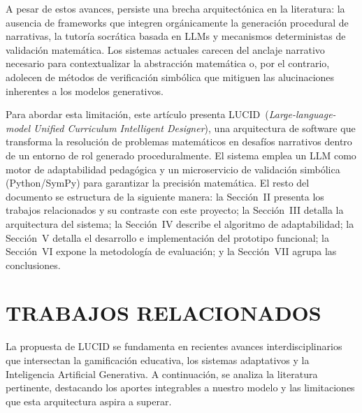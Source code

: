 \documentclass{ieeetj}
\begin{document}
A pesar de estos avances, persiste una brecha arquitect\'onica en la literatura: la ausencia
de frameworks que integren org\'anicamente la generaci\'on procedural de narrativas, la
tutor\'ia socr\'atica basada en LLMs y mecanismos deterministas de validaci\'on matem\'atica.
Los sistemas actuales carecen del anclaje narrativo necesario para contextualizar la
abstracci\'on matem\'atica o, por el contrario, adolecen de m\'etodos de verificaci\'on
simb\'olica que mitiguen las alucinaciones inherentes a los modelos generativos.

Para abordar esta limitaci\'on, este art\'iculo presenta LUCID~(\textit{Large-language-model
Unified Curriculum Intelligent Designer}), una arquitectura de software que transforma la
resoluci\'on de problemas matem\'aticos en desaf\'ios narrativos dentro de un entorno de rol
generado proceduralmente. El sistema emplea un LLM como motor de adaptabilidad pedag\'ogica
y un microservicio de validaci\'on simb\'olica (Python/SymPy) para garantizar la precisi\'on
matem\'atica. El resto del documento se estructura de la siguiente manera: la Secci\'on~II
presenta los trabajos relacionados y su contraste con este proyecto; la Secci\'on~III detalla
la arquitectura del sistema; la Secci\'on~IV describe el algoritmo de adaptabilidad;
la Secci\'on~V detalla el desarrollo e implementaci\'on del prototipo funcional;
la Secci\'on~VI expone la metodolog\'ia de evaluaci\'on; y la Secci\'on~VII agrupa las
conclusiones.

\section{TRABAJOS RELACIONADOS}
La propuesta de LUCID se fundamenta en recientes avances interdisciplinarios que intersectan
la gamificaci\'on educativa, los sistemas adaptativos y la Inteligencia Artificial Generativa.
A continuaci\'on, se analiza la literatura pertinente, destacando los aportes integrables a
nuestro modelo y las limitaciones que esta arquitectura aspira a superar.
\end{document}

